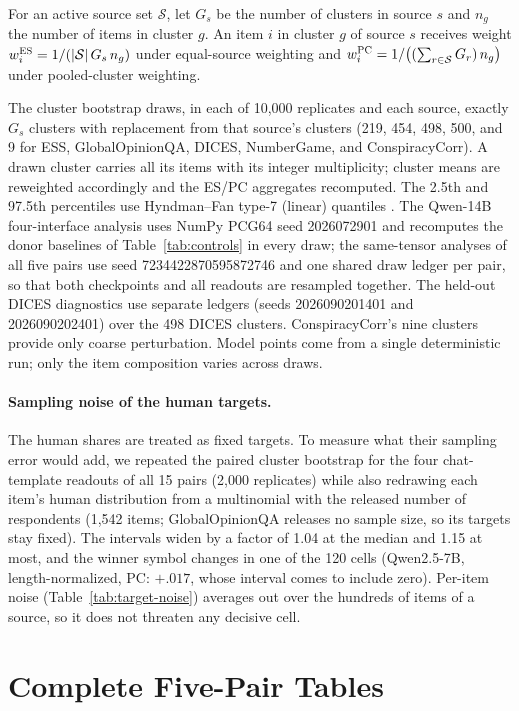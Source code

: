 \documentclass[11pt]{article}
\newcommand{\ES}{\textsc{ES}}
\newcommand{\PC}{\textsc{PC}}
\begin{document}
For an active source set $\mathcal S$, let $G_s$ be the number of clusters in
source $s$ and $n_g$ the number of items in cluster $g$. An item $i$ in cluster
$g$ of source $s$ receives weight
$w_i^{\ES}=1/(|\mathcal S|\,G_s\,n_g)$ under equal-source weighting and
$w_i^{\PC}=1/\big((\sum_{r\in\mathcal S}G_r)\,n_g\big)$ under pooled-cluster
weighting.

The cluster bootstrap draws, in each of 10,000 replicates and each source,
exactly $G_s$ clusters with replacement from that source's clusters (219,
454, 498, 500, and 9 for ESS, GlobalOpinionQA, DICES, NumberGame, and
ConspiracyCorr). A drawn cluster carries all its items with its integer
multiplicity; cluster means are reweighted accordingly and the \ES{}/\PC{}
aggregates recomputed. The 2.5th and 97.5th percentiles use Hyndman--Fan
type-7 (linear) quantiles \cite{hyndman1996sample}. The Qwen-14B four-interface
analysis uses NumPy PCG64 seed 2026072901 and recomputes the donor baselines
of Table~\ref{tab:controls} in every draw; the same-tensor analyses of all five
pairs use seed 7234422870595872746 and one shared draw ledger per pair, so that
both checkpoints and all readouts are resampled together. The held-out DICES
diagnostics use separate ledgers (seeds 2026090201401 and 2026090202401) over
the 498 DICES clusters. ConspiracyCorr's nine clusters provide only coarse
perturbation. Model points come from a single deterministic run; only the item
composition varies across draws.

\paragraph{Sampling noise of the human targets.}
The human shares are treated as fixed targets. To measure what their sampling
error would add, we repeated the paired cluster bootstrap for the four
chat-template readouts of all 15 pairs (2,000 replicates) while also redrawing
each item's human distribution from a multinomial with the released number of
respondents (1,542 items; GlobalOpinionQA releases no sample size, so its
targets stay fixed). The intervals widen by a factor of 1.04 at the median and
1.15 at most, and the winner symbol changes in one of the 120 cells
(Qwen2.5-7B, length-normalized, \PC{}: $+.017$, whose interval comes to
include zero). Per-item noise (Table~\ref{tab:target-noise}) averages out
over the hundreds of items of a source, so it does not threaten any decisive
cell.

\section{Complete Five-Pair Tables}
\label{app:five-pair-tables}
\end{document}
